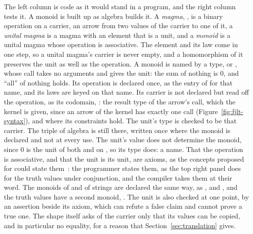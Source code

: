 The left column is code as it would stand in a program, and the right column tests it.
A monoid is built up as algebra builds it.
A \emph{magma}, , is a binary operation on a carrier, an arrow from two values of the carrier to one of it, a \emph{unital magma} is a magma with an element that is a unit, and a \emph{monoid} is a unital magma whose operation is associative.
The element and its law come in one step, so a unital magma's carrier is never empty, and a homomorphism of it preserves the unit as well as the operation.
A monoid is named by a type,  or , whose call takes no arguments and gives the unit: the sum of nothing is $0$, and ``all'' of nothing holds.
Its operation is declared once, as the entry of  for that name, and its laws are keyed on that name.
Its carrier is not declared but read off the operation, as its codomain, : the result type of the arrow's call, which the kernel is given, since an arrow of the kernel has exactly one call (Figure~\ref{fig:fjlt-syntax}), and where its constraints hold.
The unit's type is checked to be that carrier.
The triple of algebra is still there, written once where the monoid is declared and not at every use.
The unit's value does not determine the monoid, since $0$ is the unit of both \cppinline{+} and  on , so its type does: a name.
That the operation is associative, and that the unit is its unit, are axioms, as the concepts proposed for  could state them~\cite{gregor2006concepts,bagge2009axioms}: the programmer states them, as the top right panel does for the truth values under conjunction, and the compiler takes them at their word.
The monoids of  and of strings are declared the same way, as ,  and , and the truth values have a second monoid, .
The unit is also checked at one point, by an assertion beside its axiom, which can refute a false claim and cannot prove a true one.
The shape itself asks of the carrier only that its values can be copied, and in particular no equality, for a reason that Section~\ref{sec:translation} gives.

